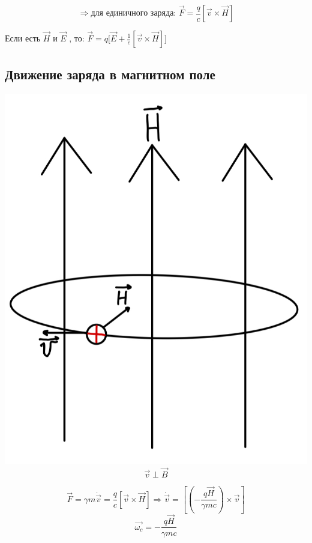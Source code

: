 \[
\Rightarrow\text{для единичного заряда: }\vec{F}=\frac{q}{c}[\vec{v}\times \vec{H}] 
\]

Если есть $\vec{H}\text{ и }\vec{E}\text{ , то: }\boxed{\vec{F}=q \bigg[\vec{E}+\frac{1}{c}[\vec{v} \times \vec{H}]\bigg] }$

\newpage

\subsection*{Движение заряда в магнитном поле}

\noindent
\begin{minipage}[c]{0.35\textwidth} %
    \includegraphics[width=\textwidth]{im/57.png}{\[\vec{v}\perp\vec{B} \]} %
\end{minipage}%
\hfill
\begin{minipage}[c]{0.55\textwidth} %
    
    \[
    \vec{F}=\gamma m\dot{\vec{v}}=\frac{q}{c}[\vec{v}\times \vec{H}] \Rightarrow \dot{\vec{v}}=\left[ \left( -\frac{q\vec{H}}{\gamma mc}  \right) \times \vec{v} \right]
    \]
    \[
    \vec{\omega_c}=-\frac{q\vec{H}}{\gamma mc} 
    \]
\end{minipage}

